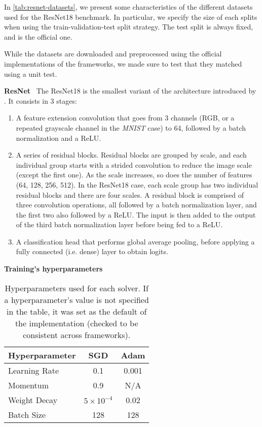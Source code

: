 \documentclass{article}
\newcommand{\myparagraph}[1]{\vspace{1mm}\noindent\textbf{#1} \,}
\begin{document}
In \autoref{tab:resnet-datasets}, we present some characteristics of the different datasets used for the ResNet18 benchmark.
In particular, we specify the size of each splits when using the train-validation-test split strategy.
The test split is always fixed, and is the official one.

While the datasets are downloaded and preprocessed using the official implementations of the frameworks, we made sure to test that they matched using a unit test.


\myparagraph{ResNet}
The ResNet18 is the smallest variant of the architecture introduced by \citet{He2016}.
It consists in 3 stages:
\begin{enumerate}[topsep=0pt,itemsep=1ex,partopsep=0ex,parsep=0ex,leftmargin=3ex]
    \item A feature extension convolution that goes from 3 channels (RGB, or a repeated grayscale channel in the \emph{MNIST} case) to 64, followed by a batch normalization and a ReLU.
    \item A series of residual blocks. Residual blocks are grouped by scale, and each individual group starts with a strided convolution to reduce the image scale (except the first one). As the scale increases, so does the number of features (64, 128, 256, 512). In the ResNet18 case, each scale group has two individual residual blocks and there are four scales. A residual block is comprised of three convolution operations, all followed by a batch normalization layer, and the first two also followed by a ReLU. The input is then added to the output of the third batch normalization layer before being fed to a ReLU.
    \item A classification head that performs global average pooling, before applying a fully connected (i.e. dense) layer to obtain logits.
\end{enumerate}


\myparagraph{Training's hyperparameters}
\begin{table}[bth!]
\centering
\caption{Hyperparameters used for each solver. If a hyperparameter's value is not specified in the table, it was set as the default of the implementation (checked to be consistent across frameworks).}
\begin{tabular}{lcc}
\toprule
\textbf{Hyperparameter} & \textbf{SGD} & \textbf{Adam} \\
\midrule
Learning Rate  & 0.1               & 0.001          \\
Momentum       & 0.9               & N/A           \\
Weight Decay   & $5\times 10^{-4}$ & 0.02          \\
Batch Size     & 128               & 128           \\
\bottomrule
\end{tabular}
\medskip
\label{tab:hp-resnet}
\end{table}
\end{document}
